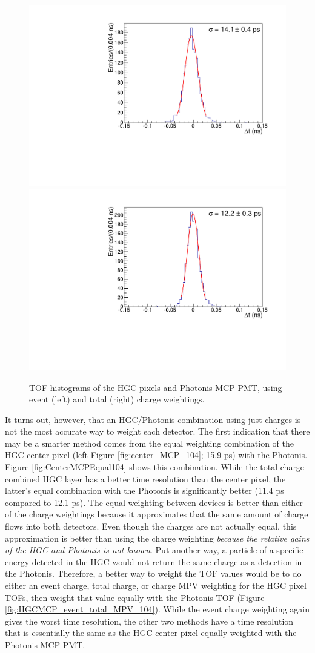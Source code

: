 \documentclass[twocolumn,aps,prd,reprint,superscriptaddress,floatfix]{revtex4-1}
\begin{document}
\begin{figure}[!htbp]
	\centering
	\includegraphics[width=.49\linewidth]{deltaT_PicoSil_MCP_EventCharge104.pdf}
	\includegraphics[width=.5\linewidth]{deltaT_PicoSil_MCP_TotalCharge104.pdf}
	\caption{TOF histograms of the HGC pixels and Photonis MCP-PMT, using event (left) and total (right) charge weightings.}
	\label{fig:HGC_MCP_event_total_104}
\end{figure}

It turns out, however, that an HGC/Photonis combination using just charges is not the most accurate way to weight each detector. 
The first indication that there may be a smarter method comes from the equal weighting combination of the HGC center pixel (left Figure \ref{fig:center_MCP_104}; 15.9 ps) with the Photonis. 
Figure \ref{fig:CenterMCPEqual104} shows this combination. 
While the total charge-combined HGC layer has a better time resolution than the center pixel, the latter's equal combination with the Photonis is significantly better (11.4 ps compared to 12.1 ps). 
The equal weighting between devices is better than either of the charge weightings because it approximates that the same amount of charge flows into both detectors.
Even though the charges are not actually equal, this approximation is better than using the charge weighting \textit{because the relative gains of the HGC and Photonis is not known}. 
Put another way, a particle of a specific energy detected in the HGC would not return the same charge as a detection in the Photonis. 
Therefore, a better way to weight the TOF values would be to do either an event charge, total charge, or charge MPV weighting for the HGC pixel TOFs, then weight that value equally with the Photonis TOF (Figure \ref{fig:HGCMCP_event_total_MPV_104}). 
While the event charge weighting again gives the worst time resolution, the other two methods have a time resolution that is essentially the same as the HGC center pixel equally weighted with the Photonis MCP-PMT. 
\end{document}
